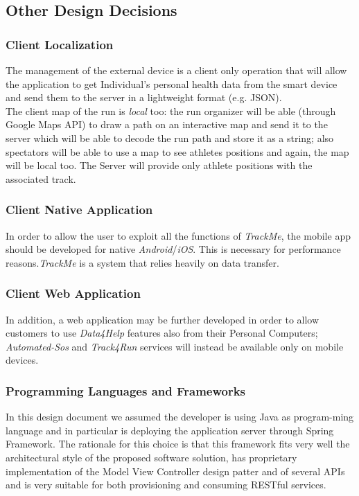 \documentclass[a4paper]{article}
\begin{document}
\subsection{Other Design Decisions}
\subsubsection{Client Localization}
The management of the external device is a client only operation that will allow the application to get Individual's personal health data from the smart device and send them to the server in a lightweight format (e.g. JSON).\\ 

The client map of the run is \textit{local} too: the run organizer will be able (through Google Maps API) to draw a path on an interactive map and send it to the server which will be able to decode the run path and store it as a string; also spectators will be able to use a map to see athletes positions and again, the map will be local too. The Server will provide only athlete positions with the associated track.

\subsubsection{Client Native Application}
In order to allow the user to exploit all the functions of \textit{TrackMe}, the mobile app should be developed for native \textit{Android}/\textit{iOS}. This is necessary for performance reasons.\textit{TrackMe} is a system that relies heavily on data transfer.

\subsubsection{Client Web Application}
In addition, a web application may be further developed in order to allow customers to use \textit{Data4Help} features also from their Personal Computers; \textit{Automated-Sos} and \textit{Track4Run} services will instead be available only on mobile devices.

\subsubsection{Programming Languages and Frameworks}
In this design document we assumed the developer is using Java as program-\newline ming language and in particular is deploying the application server through Spring Framework. The rationale for this choice is that this framework fits very well the architectural style of the proposed software solution, has proprietary implementation of the Model View Controller design patter and of several APIs and is very suitable for both provisioning and consuming RESTful services. \\
\end{document}
